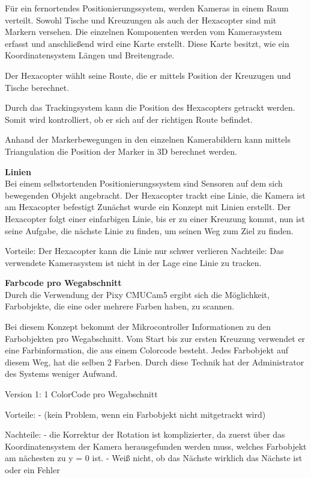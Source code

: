   Für ein fernortendes Positionierungssystem, werden Kameras in einem Raum verteilt. 
  Sowohl Tische und Kreuzungen als auch der Hexacopter sind mit Markern versehen. Die einzelnen Komponenten werden vom Kamerasystem erfasst und anschließend wird eine Karte erstellt. Diese Karte besitzt, wie ein Koordinatensystem Längen und Breitengrade.

  Der Hexacopter wählt seine Route, die er mittels Position der Kreuzugen und Tische berechnet.

  Durch das Trackingsystem kann die Position des Hexacopters getrackt werden. Somit wird kontrolliert, ob er sich auf der richtigen Route befindet.

  Anhand der Markerbewegungen in den einzelnen Kamerabildern kann mittels Triangulation die Position der Marker in 3D berechnet werden.

  \textbf{Linien}\\
  Bei einem selbstortenden Positionierungssystem sind Sensoren auf dem sich bewegenden Objekt angebracht.
  Der Hexacopter trackt eine Linie, die Kamera ist am Hexacopter befestigt
  Zunächst wurde ein Konzept mit Linien erstellt. Der Hexacopter folgt einer einfarbigen Linie, bis er zu einer Kreuzung kommt, nun ist seine Aufgabe, die nächste Linie zu finden, um seinen Weg zum Ziel zu finden.  

  Vorteile: Der Hexacopter kann die Linie nur schwer verlieren
  Nachteile: Das verwendete Kamerasystem ist nicht in der Lage eine Linie zu tracken.


  \textbf{Farbcode pro Wegabschnitt}\\
  Durch die Verwendung der Pixy CMUCam5 ergibt sich die Möglichkeit, Farbobjekte, die eine oder mehrere Farben haben, zu scannen.

  Bei diesem Konzept bekommt der Mikrocontroller Informationen zu den Farbobjekten pro Wegabschnitt. Vom Start bis zur ersten Kreuzung verwendet er eine Farbinformation, die aus einem Colorcode besteht. Jedes Farbobjekt auf diesem Weg, hat die selben 2 Farben. Durch diese Technik hat der Administrator des Systems weniger Aufwand.

  Version 1: 1 ColorCode pro Wegabschnitt

  Vorteile:
  - (kein Problem, wenn ein Farbobjekt nicht mitgetrackt wird)

  Nachteile:
  - die Korrektur der Rotation ist komplizierter, da zuerst über das Koordinatensystem der Kamera herausgefunden werden muss, welches Farbobjekt am nächesten zu y = 0 ist. 
  - Weiß nicht, ob das Nächste wirklich das Nächste ist oder ein Fehler

